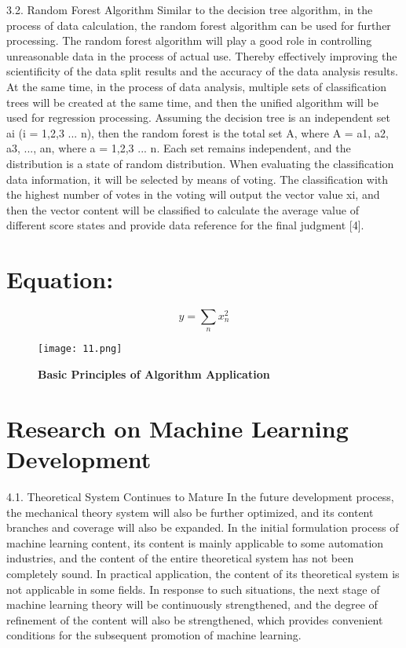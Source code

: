 \documentclass{article}
\begin{document}
3.2. Random Forest Algorithm
Similar to the decision tree algorithm, in the process of data calculation, the random forest algorithm 
can be used for further processing. The random forest algorithm will play a good role in controlling 
unreasonable data in the process of actual use. Thereby effectively improving the scientificity of the 
data split results and the accuracy of the data analysis results. At the same time, in the process of data 
analysis, multiple sets of classification trees will be created at the same time, and then the unified 
algorithm will be used for regression processing. Assuming the decision tree is an independent set ai (i 
= 1,2,3 ... n), then the random forest is the total set A, where A = {a1, a2, a3, ..., an}, where a = 1,2,3 ... 
n. Each set remains independent, and the distribution is a state of random distribution. When 
evaluating the classification data information, it will be selected by means of voting. The classification 
with the highest number of votes in the voting will output the vector value xi, and then the vector 
content will be classified to calculate the average value of different score states and provide data 
reference for the final judgment [4].



\section{Equation:}
\begin{equation}
    y=\sum_n x_n^2
\end{equation}

\begin{figure}
    \centering
    \texttt{[image: 11.png]}
    \caption{\textbf{Basic Principles of Algorithm Application} }
    \label{fig:my_label}
\end{figure}


\section{Research on Machine Learning Development}
4.1. Theoretical System Continues to Mature
In the future development process, the mechanical theory system will also be further optimized, and its 
content branches and coverage will also be expanded. In the initial formulation process of machine 
learning content, its content is mainly applicable to some automation industries, and the content of the 
entire theoretical system has not been completely sound. In practical application, the content of its 
theoretical system is not applicable in some fields. In response to such situations, the next stage of 
machine learning theory will be continuously strengthened, and the degree of refinement of the content 
will also be strengthened, which provides convenient conditions for the subsequent promotion of 
machine learning.
\end{document}
